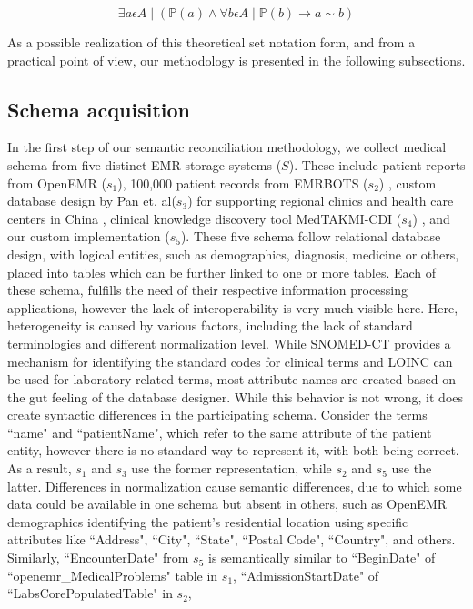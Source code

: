 \begin{equation}\label{uniqueA}
\exists a \epsilon A \mid ( \mathbb{P}(a) \wedge \forall b \epsilon A \mid \mathbb{P}(b) \rightarrow a \sim b)
\end{equation}


As a possible realization of this theoretical set notation form, and from a practical point of view, our methodology is presented in the following subsections.

\subsection*{Schema acquisition}
\label{schema_acq}
In the first step of our semantic reconciliation methodology, we collect medical schema from five distinct EMR storage systems ($S$). These include patient reports from OpenEMR ($s_1$), 100,000 patient records from EMRBOTS ($s_2$) \cite{kartoun2016methodology}, custom database design by Pan et. al($s_3$) for supporting regional clinics and health care centers in China \cite{pan2016design}, clinical knowledge discovery tool MedTAKMI-CDI ($s_4$) \cite{inokuchi2007medtakmi}, and our custom implementation ($s_5$). These five schema follow relational database design, with logical entities, such as demographics, diagnosis, medicine or others, placed into tables which can be further linked to one or more tables. Each of these schema, fulfills the need of their respective information processing applications, however the lack of interoperability is very much visible here. Here, heterogeneity is caused by various factors, including the lack of standard terminologies and different normalization level.
While SNOMED-CT provides a mechanism for identifying the standard codes for clinical terms and LOINC can be used for laboratory related terms, most attribute names are created based on the gut feeling of the database designer. While this behavior is not wrong, it does create syntactic differences in the participating schema. Consider the terms ``name" and ``patientName", which refer to the same attribute of the patient entity, however there is no standard way to represent it, with both being correct. As a result, $s_1$ and $s_3$ use the former representation, while $s_2$ and $s_5$ use the latter. 
Differences in normalization cause semantic differences, due to which some data could be available in one schema but absent in others, such as OpenEMR demographics identifying the patient's residential location using specific attributes like ``Address", ``City", ``State", ``Postal Code", ``Country", and others. Similarly, ``EncounterDate" from $s_5$ is semantically similar to ``BeginDate" of ``openemr\_MedicalProblems" table in $s_1$, ``AdmissionStartDate" of ``LabsCorePopulatedTable" in $s_2$, 

